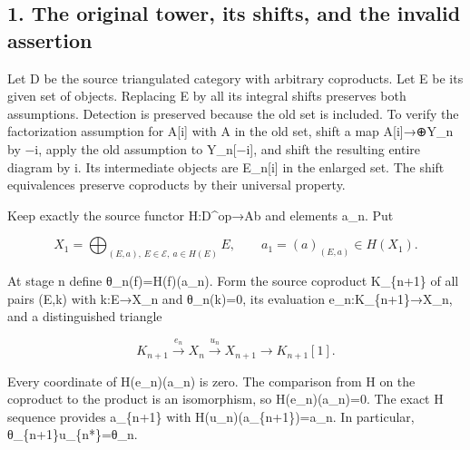\documentclass[11pt]{article}
\begin{document}
\subsection{\texorpdfstring{1. The original tower,\allowbreak{} its shifts,\allowbreak{} and the invalid assertion}{1. The original  its  and the invalid assertion}}\label{proofs-11460-11655-the-original-tower-its-shifts-and-the-invalid-assertion}

Let D be the source triangulated category with arbitrary coproducts. Let E be its given set of objects. Replacing E by all its integral shifts preserves both assumptions. Detection is preserved because the old set is included. To verify the factorization assumption for A[i]\allowbreak{} with A in the old set,\allowbreak{} shift a map A[i]\allowbreak{}\allowbreak{}→\allowbreak{}⊕Y\_\allowbreak{}n by −i,\allowbreak{} apply the old assumption to Y\_\allowbreak{}n[−i]\allowbreak{},\allowbreak{} and shift the resulting entire diagram by i. Its intermediate objects are E\_\allowbreak{}n[i]\allowbreak{} in the enlarged set. The shift equivalences preserve coproducts by their universal property.

Keep exactly the source functor H:\allowbreak{}D\textasciicircum{}op\allowbreak{}→Ab and elements a\_\allowbreak{}n. Put

\[
 X_1=\bigoplus_{(E,a),\,E\in\mathcal E,\ a\in H(E)}E,\qquad
 a_1=(a)_{(E,a)}\in H(X_1).
\]

At stage n define θ\_\allowbreak{}n(f)\allowbreak{}\allowbreak{}=H(f)\allowbreak{}(a\_\allowbreak{}n)\allowbreak{}. Form the source coproduct K\_\allowbreak{}\{n\allowbreak{}+1\} of all pairs (E,\allowbreak{}k)\allowbreak{} with k:\allowbreak{}E\allowbreak{}→X\_\allowbreak{}n and θ\_\allowbreak{}n(k)\allowbreak{}\allowbreak{}=0,\allowbreak{} its evaluation e\_\allowbreak{}n:\allowbreak{}K\_\allowbreak{}\{n\allowbreak{}+1\}\allowbreak{}→X\_\allowbreak{}n,\allowbreak{} and a distinguished triangle

\[
 K_{n+1}\xrightarrow{e_n}X_n\xrightarrow{u_n}X_{n+1}
 \longrightarrow K_{n+1}[1].
\]

Every coordinate of H(e\_\allowbreak{}n)\allowbreak{}(a\_\allowbreak{}n)\allowbreak{} is zero. The comparison from H on the coproduct to the product is an isomorphism,\allowbreak{} so H(e\_\allowbreak{}n)\allowbreak{}(a\_\allowbreak{}n)\allowbreak{}\allowbreak{}=0. The exact H sequence provides a\_\allowbreak{}\{n\allowbreak{}+1\} with H(u\_\allowbreak{}n)\allowbreak{}(a\_\allowbreak{}\{n\allowbreak{}+1\})\allowbreak{}\allowbreak{}=a\_\allowbreak{}n. In particular,\allowbreak{} θ\_\allowbreak{}\{n\allowbreak{}+1\}u\_\allowbreak{}\{n*\}\allowbreak{}=θ\_\allowbreak{}n.
\end{document}
